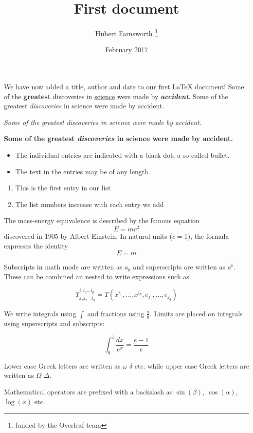\documentclass[12pt, letterpaper]{article}
\title{First document}
\author{Hubert Farnsworth \thanks{funded by the Overleaf team}}
\date{February 2017}
\begin{document}
\maketitle

We have now added a title, author and date to our first \LaTeX{} document!
Some of the \textbf{greatest}
discoveries in \underline{science} 
were made by \textbf{\textit{accident}}.
Some of the greatest \emph{discoveries} 
in science 
were made by accident.

\textit{Some of the greatest \emph{discoveries} 
in science 
were made by accident.}

\textbf{Some of the greatest \emph{discoveries} 
in science 
were made by accident.}

\begin{itemize}
  \item The individual entries are indicated with a black dot, a so-called bullet.
  \item The text in the entries may be of any length.
\end{itemize}

\begin{enumerate}
  \item This is the first entry in our list
  \item The list numbers increase with each entry we add
\end{enumerate}

The mass-energy equivalence is described by the famous equation
\[ E=mc^2 \]
discovered in 1905 by Albert Einstein. 
In natural units ($c = 1$), the formula expresses the identity
\begin{equation}
E=m
\end{equation}

Subscripts in math mode are written as $a_b$ and superscripts are written as $a^b$. These can be combined an nested to write expressions such as

\[ T^{i_1 i_2 \dots i_p}_{j_1 j_2 \dots j_q} = T(x^{i_1},\dots,x^{i_p},e_{j_1},\dots,e_{j_q}) \]
 
We write integrals using $\int$ and fractions using $\frac{a}{b}$. Limits are placed on integrals using superscripts and subscripts:

\[ \int_0^1 \frac{dx}{e^x} =  \frac{e-1}{e} \]

Lower case Greek letters are written as $\omega$ $\delta$ etc. while upper case Greek letters are written as $\Omega$ $\Delta$.

Mathematical operators are prefixed with a backslash as $\sin(\beta)$, $\cos(\alpha)$, $\log(x)$ etc.
\end{document}
